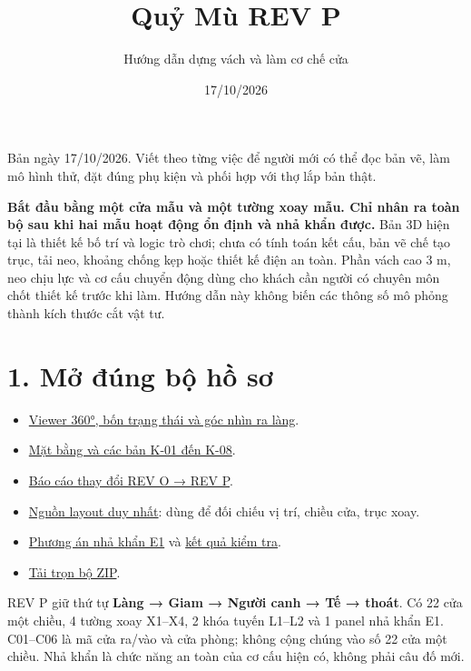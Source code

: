 \documentclass[
  11pt,
  a4paper,
]{article}
\title{Quỷ Mù REV P}
\subtitle{Hướng dẫn dựng vách và làm cơ chế cửa}
\author{}
\date{17/10/2026}
\providecommand{\tightlist}{%
  \setlength{\itemsep}{0pt}\setlength{\parskip}{0pt}}
\begin{document}
\maketitle

{
\setcounter{tocdepth}{3}
\tableofcontents
\clearpage
}
Bản ngày 17/10/2026. Viết theo từng việc để người mới có thể đọc bản vẽ,
làm mô hình thử, đặt đúng phụ kiện và phối hợp với thợ lắp bản thật.

\textbf{Bắt đầu bằng một cửa mẫu và một tường xoay mẫu. Chỉ nhân ra toàn
bộ sau khi hai mẫu hoạt động ổn định và nhả khẩn được.} Bản 3D hiện tại
là thiết kế bố trí và logic trò chơi; chưa có tính toán kết cấu, bản vẽ
chế tạo trục, tải neo, khoảng chống kẹp hoặc thiết kế điện an toàn. Phần
vách cao 3 m, neo chịu lực và cơ cấu chuyển động dùng cho khách cần
người có chuyên môn chốt thiết kế trước khi làm. Hướng dẫn này không
biến các thông số mô phỏng thành kích thước cắt vật tư.

\section{1. Mở đúng bộ hồ
sơ}\label{mux1edf-ux111uxfang-bux1ed9-hux1ed3-sux1a1}

\begin{itemize}
\tightlist
\item
  \href{https://dam-truong.github.io/quy-mu-rev-p/model-360.html}{Viewer
  360°, bốn trạng thái và góc nhìn ra làng}.
\item
  \href{https://dam-truong.github.io/quy-mu-rev-p/blueprint/index.html}{Mặt
  bằng và các bản K-01 đến K-08}.
\item
  \href{https://dam-truong.github.io/quy-mu-rev-p/HUONG-DAN.html}{Báo
  cáo thay đổi REV O → REV P}.
\item
  \href{https://dam-truong.github.io/quy-mu-rev-p/src/layout.js}{Nguồn
  layout duy nhất}: dùng để đối chiếu vị trí, chiều cửa, trục xoay.
\item
  \href{https://dam-truong.github.io/quy-mu-rev-p/blueprint/K-08-nha-khan.html}{Phương
  án nhả khẩn E1} và
  \href{https://dam-truong.github.io/quy-mu-rev-p/emergency-plan.json}{kết
  quả kiểm tra}.
\item
  \href{https://dam-truong.github.io/quy-mu-rev-p/Quy-Mu-REV-P.zip}{Tải
  trọn bộ ZIP}.
\end{itemize}

REV P giữ thứ tự \textbf{Làng → Giam → Người canh → Tế → thoát}. Có 22
cửa một chiều, 4 tường xoay X1--X4, 2 khóa tuyến L1--L2 và 1 panel nhả
khẩn E1. C01--C06 là mã cửa ra/vào và cửa phòng; không cộng chúng vào số
22 cửa một chiều. Nhả khẩn là chức năng an toàn của cơ cấu hiện có,
không phải câu đố mới.
\end{document}
